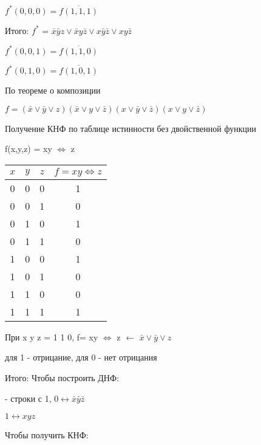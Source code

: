 \documentclass[russian]{lecture-notes}
\begin{document}
    $f^{*}(0,0,0) = \overline{f(1,1,1)}$

    Итого: $f^{*}$ = $\bar{x}\bar{y}z \vee \bar{x}y\bar{z} \vee x\bar{y}\bar{z} \vee xy\bar{z}$

    $f^{*}(0,0,1) = \overline{f(1,1,0)}$

    $f^{*}(0,1,0) = \overline{f(1,0,1)}$

    По теореме о композиции

    $f = (\bar{x} \vee \bar{y} \vee z)(\bar{x} \vee y \vee \bar{z})(x \vee \bar{y} \vee \bar{z})(x \vee y \vee \bar{z})$

    Получение КНФ по таблице истинности без двойственной функции

    f(x,y,z) = xy $\Leftrightarrow$ z

    \begin{table}[h!]
        \centering
        \begin{tabular}{|c|c|c|c|}
            \hline
            $x$ & $y$ & $z$ & $f = xy \Leftrightarrow z $ \\ \hline
            0     & 0   & 0 & 1                           \\ \hline
            0     & 0   & 1 & 0                           \\ \hline
            0     & 1   & 0 & 1                           \\ \hline
            0     & 1   & 1 & 0                           \\ \hline
            1     & 0   & 0 & 1                           \\ \hline
            1     & 0   & 1 & 0                           \\ \hline
            1     & 1   & 0 & 0                           \\ \hline
            1     & 1   & 1 & 1                           \\ \hline
        \end{tabular}
    \end{table}


    При x y z = 1 1 0, f= xy $\Leftrightarrow$ z $\leftarrow$ $\bar{x}\lor\bar{y}\lor z$

    для 1 - отрицание, для 0 - нет отрицания

    Итого: Чтобы построить ДНФ:

    - строки с 1, $0 \leftrightarrow \bar{x}\bar{y}\bar{z}$

    \qquad \qquad \qquad $1 \leftrightarrow xyz$

    Чтобы получить КНФ:
\end{document}
